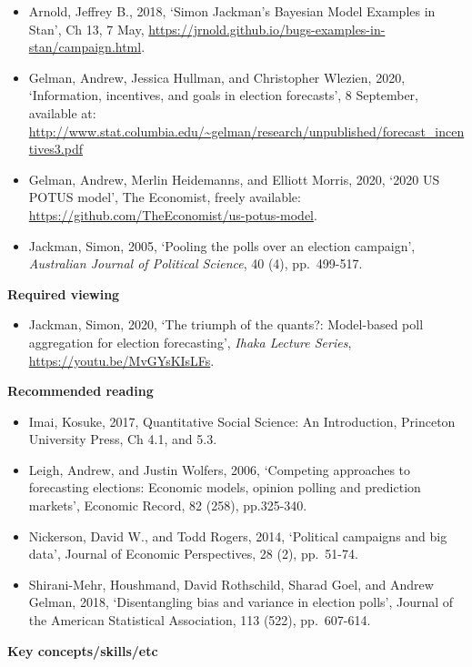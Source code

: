 \documentclass[
]{book}
\providecommand{\tightlist}{%
  \setlength{\itemsep}{0pt}\setlength{\parskip}{0pt}}
\begin{document}
\begin{itemize}
\tightlist
\item
  Arnold, Jeffrey B., 2018, `Simon Jackman's Bayesian Model Examples in Stan', Ch 13, 7 May, \url{https://jrnold.github.io/bugs-examples-in-stan/campaign.html}.
\item
  Gelman, Andrew, Jessica Hullman, and Christopher Wlezien, 2020, `Information, incentives, and goals in election forecasts', 8 September, available at: \url{http://www.stat.columbia.edu/~gelman/research/unpublished/forecast_incentives3.pdf}
\item
  Gelman, Andrew, Merlin Heidemanns, and Elliott Morris, 2020, `2020 US POTUS model', The Economist, freely available: \url{https://github.com/TheEconomist/us-potus-model}.
\item
  Jackman, Simon, 2005, `Pooling the polls over an election campaign', \emph{Australian Journal of Political Science}, 40 (4), pp.~499-517.
\end{itemize}

\textbf{Required viewing}

\begin{itemize}
\tightlist
\item
  Jackman, Simon, 2020, `The triumph of the quants?: Model-based poll aggregation for election forecasting', \emph{Ihaka Lecture Series}, \url{https://youtu.be/MvGYsKIsLFs}.
\end{itemize}

\textbf{Recommended reading}

\begin{itemize}
\tightlist
\item
  Imai, Kosuke, 2017, Quantitative Social Science: An Introduction, Princeton University Press, Ch 4.1, and 5.3.
\item
  Leigh, Andrew, and Justin Wolfers, 2006, `Competing approaches to forecasting elections: Economic models, opinion polling and prediction markets', Economic Record, 82 (258), pp.325-340.
\item
  Nickerson, David W., and Todd Rogers, 2014, `Political campaigns and big data', Journal of Economic Perspectives, 28 (2), pp.~51-74.
\item
  Shirani-Mehr, Houshmand, David Rothschild, Sharad Goel, and Andrew Gelman, 2018, `Disentangling bias and variance in election polls', Journal of the American Statistical Association, 113 (522), pp.~607-614.
\end{itemize}

\textbf{Key concepts/skills/etc}
\end{document}

